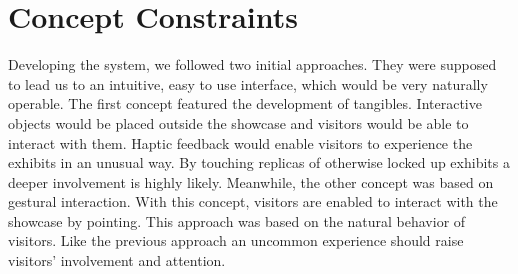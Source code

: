 %


%


\section{Concept Constraints}
\label{conception_constraints}

Developing the system, we followed two initial approaches. They were supposed to lead us to an intuitive, easy to use interface, which would be very naturally operable. The first concept featured the development of tangibles. Interactive objects would be placed outside the showcase and visitors would be able to interact with them. Haptic feedback would enable visitors to experience the exhibits in an unusual way. By touching replicas of otherwise locked up exhibits a deeper involvement is highly likely. Meanwhile, the other concept was based on gestural interaction. With this concept, visitors are enabled to interact with the showcase by pointing. This approach was based on the natural behavior of visitors. Like the previous approach an uncommon experience should raise visitors' involvement and attention.

